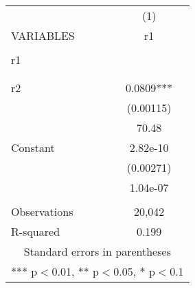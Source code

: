 \begin{tabular}{lc} \hline
 & (1) \\
VARIABLES & r1 \\ \hline
 &  \\
r1 &  \\
 &  \\
 &  \\
r2 & 0.0809*** \\
 & (0.00115) \\
 & 70.48 \\
Constant & 2.82e-10 \\
 & (0.00271) \\
 & 1.04e-07 \\
 &  \\
Observations & 20,042 \\
 R-squared & 0.199 \\ \hline
\multicolumn{2}{c}{ Standard errors in parentheses} \\
\multicolumn{2}{c}{ *** p$<$0.01, ** p$<$0.05, * p$<$0.1} \\
\end{tabular}
